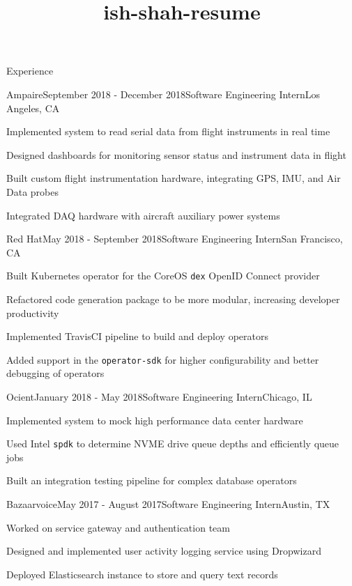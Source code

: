 \documentclass{resume} %
\title{ish-shah-resume}
\begin{document}
    
    \begin{rSection}{Experience}
    
    \begin{rSubsection}{Ampaire}{September 2018 - December 2018}{Software Engineering Intern}{Los Angeles, CA}
    \item Implemented system to read serial data from flight instruments in real time
    \item Designed dashboards for monitoring sensor status and instrument data in flight
    \item Built custom flight instrumentation hardware, integrating GPS, IMU, and Air Data probes
    \item Integrated DAQ hardware with aircraft auxiliary power systems
    \end{rSubsection}
    
    \begin{rSubsection}{Red Hat}{May 2018 - September 2018}{Software Engineering Intern}{San Francisco, CA}
    \item Built Kubernetes operator for the CoreOS \verb+dex+ OpenID Connect provider
    \item Refactored code generation package to be more modular, increasing developer productivity 
    \item Implemented TravisCI pipeline to build and deploy operators
    \item Added support in the \verb+operator-sdk+ for higher configurability and better debugging of operators
    \end{rSubsection}
    
    \begin{rSubsection}{Ocient}{January 2018 - May 2018}{Software Engineering Intern}{Chicago, IL}
    \item Implemented system to mock high performance data center hardware
    \item Used Intel \verb+spdk+ to determine NVME drive queue depths and efficiently queue jobs 
    \item Built an integration testing pipeline for complex database operators    
    \end{rSubsection}
    
    \begin{rSubsection}{Bazaarvoice}{May 2017 - August 2017}{Software Engineering Intern}{Austin, TX}
    \item Worked on service gateway and authentication team
    \item Designed and implemented user activity logging service using Dropwizard
    \item Deployed Elasticsearch instance to store and query text records
    \end{rSubsection}
    

\end{rSection}
\end{document}
